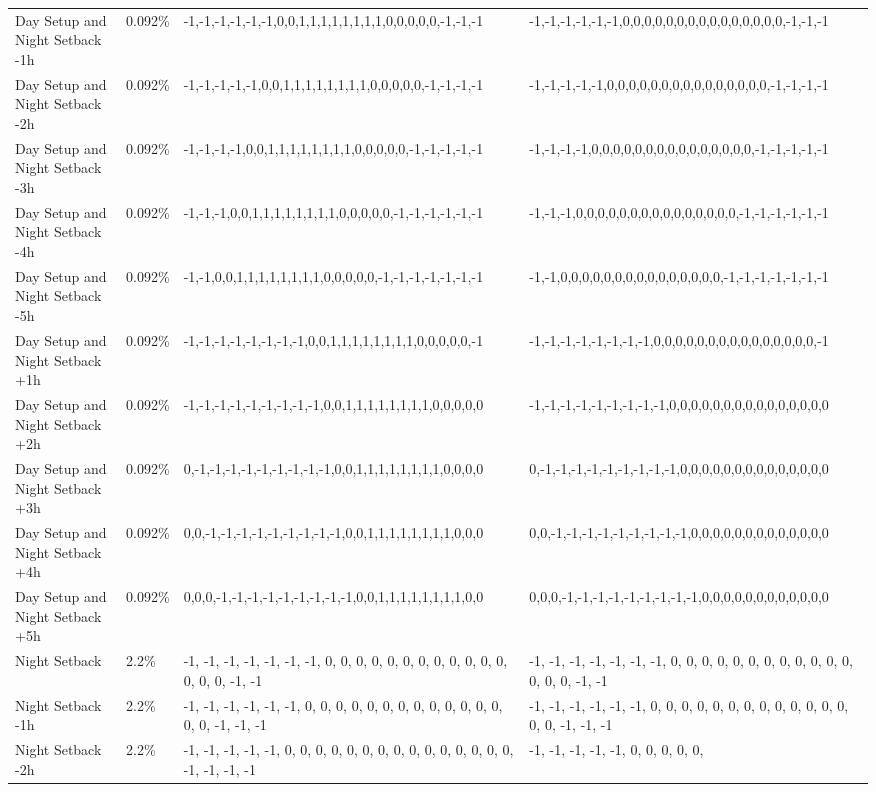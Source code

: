 \begin{longtable}[]{@{}llll@{}}
Day Setup and Night Setback -1h & 0.092\% &
-1,-1,-1,-1,-1,-1,0,0,1,1,1,1,1,1,1,1,0,0,0,0,0,-1,-1,-1 &
-1,-1,-1,-1,-1,-1,0,0,0,0,0,0,0,0,0,0,0,0,0,0,0,-1,-1,-1 \\
Day Setup and Night Setback -2h & 0.092\% &
-1,-1,-1,-1,-1,0,0,1,1,1,1,1,1,1,1,0,0,0,0,0,-1,-1,-1,-1 &
-1,-1,-1,-1,-1,0,0,0,0,0,0,0,0,0,0,0,0,0,0,0,-1,-1,-1,-1 \\
Day Setup and Night Setback -3h & 0.092\% &
-1,-1,-1,-1,0,0,1,1,1,1,1,1,1,1,0,0,0,0,0,-1,-1,-1,-1,-1 &
-1,-1,-1,-1,0,0,0,0,0,0,0,0,0,0,0,0,0,0,0,-1,-1,-1,-1,-1 \\
Day Setup and Night Setback -4h & 0.092\% &
-1,-1,-1,0,0,1,1,1,1,1,1,1,1,0,0,0,0,0,-1,-1,-1,-1,-1,-1 &
-1,-1,-1,0,0,0,0,0,0,0,0,0,0,0,0,0,0,0,-1,-1,-1,-1,-1,-1 \\
Day Setup and Night Setback -5h & 0.092\% &
-1,-1,0,0,1,1,1,1,1,1,1,1,0,0,0,0,0,-1,-1,-1,-1,-1,-1,-1 &
-1,-1,0,0,0,0,0,0,0,0,0,0,0,0,0,0,0,-1,-1,-1,-1,-1,-1,-1 \\
Day Setup and Night Setback +1h & 0.092\% &
-1,-1,-1,-1,-1,-1,-1,-1,0,0,1,1,1,1,1,1,1,1,0,0,0,0,0,-1 &
-1,-1,-1,-1,-1,-1,-1,-1,0,0,0,0,0,0,0,0,0,0,0,0,0,0,0,-1 \\
Day Setup and Night Setback +2h & 0.092\% &
-1,-1,-1,-1,-1,-1,-1,-1,-1,0,0,1,1,1,1,1,1,1,1,0,0,0,0,0 &
-1,-1,-1,-1,-1,-1,-1,-1,-1,0,0,0,0,0,0,0,0,0,0,0,0,0,0,0 \\
Day Setup and Night Setback +3h & 0.092\% &
0,-1,-1,-1,-1,-1,-1,-1,-1,-1,0,0,1,1,1,1,1,1,1,1,0,0,0,0 &
0,-1,-1,-1,-1,-1,-1,-1,-1,-1,0,0,0,0,0,0,0,0,0,0,0,0,0,0 \\
Day Setup and Night Setback +4h & 0.092\% &
0,0,-1,-1,-1,-1,-1,-1,-1,-1,-1,0,0,1,1,1,1,1,1,1,1,0,0,0 &
0,0,-1,-1,-1,-1,-1,-1,-1,-1,-1,0,0,0,0,0,0,0,0,0,0,0,0,0 \\
Day Setup and Night Setback +5h & 0.092\% &
0,0,0,-1,-1,-1,-1,-1,-1,-1,-1,-1,0,0,1,1,1,1,1,1,1,1,0,0 &
0,0,0,-1,-1,-1,-1,-1,-1,-1,-1,-1,0,0,0,0,0,0,0,0,0,0,0,0 \\
Night Setback & 2.2\% & -1, -1, -1, -1, -1, -1, -1, 0, 0, 0, 0, 0, 0, 0,
0, 0, 0, 0, 0, 0, 0, 0, -1, -1 & -1, -1, -1, -1, -1, -1, -1, 0, 0, 0, 0,
0, 0, 0, 0, 0, 0, 0, 0, 0, 0, 0, -1, -1 \\
Night Setback -1h & 2.2\% & -1, -1, -1, -1, -1, -1, 0, 0, 0, 0, 0, 0, 0,
0, 0, 0, 0, 0, 0, 0, 0, -1, -1, -1 & -1, -1, -1, -1, -1, -1, 0, 0, 0, 0,
0, 0, 0, 0, 0, 0, 0, 0, 0, 0, 0, -1, -1, -1 \\
Night Setback -2h & 2.2\% & -1, -1, -1, -1, -1, 0, 0, 0, 0, 0, 0, 0, 0,
0, 0, 0, 0, 0, 0, 0, -1, -1, -1, -1 & -1, -1, -1, -1, -1, 0, 0, 0, 0, 0,

\end{longtable}
